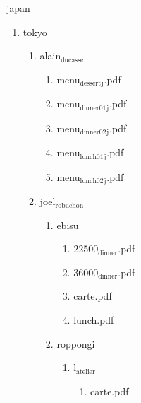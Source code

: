 \documentclass[11pt]{article}
\begin{document}
\item japan
\label{sec-1-1-1-1-21-10-4}
\begin{enumerate}
\item tokyo
\label{sec-1-1-1-1-21-10-4-1}
\begin{enumerate}
\item alain$_{\text{ducasse}}$
\label{sec-1-1-1-1-21-10-4-1-1}
\begin{enumerate}
\item menu$_{\text{dessert}}$$_{\text{j}}$.pdf
\label{sec-1-1-1-1-21-10-4-1-1-1}

\item menu$_{\text{dinner01}}$$_{\text{j}}$.pdf
\label{sec-1-1-1-1-21-10-4-1-1-2}

\item menu$_{\text{dinner02}}$$_{\text{j}}$.pdf
\label{sec-1-1-1-1-21-10-4-1-1-3}

\item menu$_{\text{lunch01}}$$_{\text{j}}$.pdf
\label{sec-1-1-1-1-21-10-4-1-1-4}

\item menu$_{\text{lunch02}}$$_{\text{j}}$.pdf
\label{sec-1-1-1-1-21-10-4-1-1-5}
\end{enumerate}

\item joel$_{\text{robuchon}}$
\label{sec-1-1-1-1-21-10-4-1-2}
\begin{enumerate}
\item ebisu
\label{sec-1-1-1-1-21-10-4-1-2-1}
\begin{enumerate}
\item 22500$_{\text{dinner}}$.pdf
\label{sec-1-1-1-1-21-10-4-1-2-1-1}

\item 36000$_{\text{dinner}}$.pdf
\label{sec-1-1-1-1-21-10-4-1-2-1-2}

\item carte.pdf
\label{sec-1-1-1-1-21-10-4-1-2-1-3}

\item lunch.pdf
\label{sec-1-1-1-1-21-10-4-1-2-1-4}
\end{enumerate}

\item roppongi
\label{sec-1-1-1-1-21-10-4-1-2-2}
\begin{enumerate}
\item l$_{\text{atelier}}$
\label{sec-1-1-1-1-21-10-4-1-2-2-1}
\begin{enumerate}
\item carte.pdf
\label{sec-1-1-1-1-21-10-4-1-2-2-1-1}


\end{enumerate}
\end{enumerate}
\end{enumerate}
\end{enumerate}
\end{enumerate}
\end{document}
